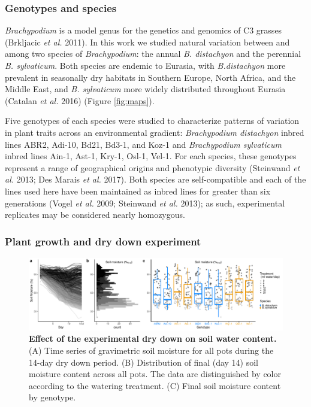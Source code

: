 \documentclass[jou,floatsintext]{apa6}
\begin{document}
\hypertarget{genotypes-and-species}{%
\subsubsection{Genotypes and species}\label{genotypes-and-species}}

\emph{Brachypodium} is a model genus for the genetics and genomics of C3 grasses (Brkljacic \emph{et al.} 2011). In this work we studied natural variation between and among two species of \emph{Brachypodium}: the annual \emph{B. distachyon} and the perennial \emph{B. sylvaticum}. Both species are endemic to Eurasia, with \emph{B.distachyon} more prevalent in seasonally dry habitats in Southern Europe, North Africa, and the Middle East, and \emph{B. sylvaticum} more widely distributed throughout Eurasia (Catalan \emph{et al.} 2016) (Figure \ref{fig:maps}).

Five genotypes of each species were studied to characterize patterns of variation in plant traits across an environmental gradient: \emph{Brachypodium distachyon} inbred lines ABR2, Adi-10, Bd21, Bd3-1, and Koz-1 and \emph{Brachypodium sylvaticum} inbred lines Ain-1, Ast-1, Kry-1, Osl-1, Vel-1. For each species, these genotypes represent a range of geographical origins and phenotypic diversity (Steinwand \emph{et al.} 2013; Des Marais \emph{et al.} 2017). Both species are self-compatible and each of the lines used here have been maintained as inbred lines for greater than six generations (Vogel \emph{et al.} 2009; Steinwand \emph{et al.} 2013); as such, experimental replicates may be considered nearly homozygous.

\hypertarget{plant-growth-and-dry-down-experiment}{%
\subsubsection{Plant growth and dry down experiment}\label{plant-growth-and-dry-down-experiment}}



\begin{figure}[!h]
\includegraphics[width=\textwidth]{../Figures/DryDown_lines} \caption{\textbf{Effect of the experimental dry down on soil water content.} (A) Time series of gravimetric soil moisture for all pots during the 14-day dry down period. (B) Distribution of final (day 14) soil moisture content across all pots. The data are distinguished by color according to the watering treatment. (C) Final soil moisture content by genotype.}\label{fig:drydown}
\end{figure}
\end{document}
